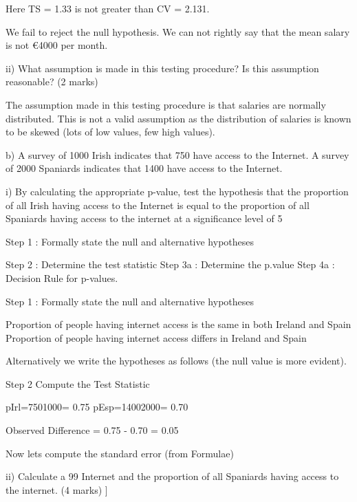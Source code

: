 \documentclass[12pt]{report}
\begin{document}
Here TS = 1.33  is not greater than CV = 2.131.


We fail to reject the null hypothesis. We can not rightly say that the mean salary is not €4000 per month.


ii)      What assumption is made in this testing procedure? Is this assumption reasonable?  (2 marks)

The assumption made in this testing procedure is that salaries are normally distributed.
This is not a valid assumption as the distribution of salaries is known to be skewed (lots of low values, few high values).







b) A survey of 1000 Irish indicates that 750 have access to the Internet. A survey of 2000 Spaniards indicates that 1400 have access to the Internet.

i)        By calculating the appropriate p-value, test the hypothesis that the proportion of all Irish having access to the Internet
is equal to the proportion of all Spaniards having access to the internet at a significance level of 5%



Step 1 : Formally state the null and alternative hypotheses

Step 2 : Determine the test statistic
Step 3a : Determine the p.value
Step 4a : Decision Rule for p-values.



Step 1 : Formally state the null and alternative hypotheses

Proportion of people having internet access is the same in both Ireland and Spain
Proportion of people having internet access differs in Ireland and Spain


Alternatively we write the hypotheses as follows (the null value is more evident).




Step 2 Compute the Test Statistic

pIrl=7501000= 0.75 
pEsp=14002000= 0.70

Observed Difference = 0.75 - 0.70 = 0.05  

Now lets compute the standard error (from Formulae)


ii)      Calculate a 99%
Internet and the proportion of all Spaniards having access to the internet.  (4 marks)
]
\end{document}
